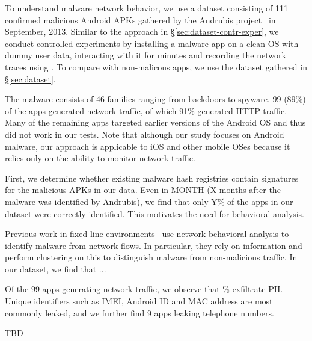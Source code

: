  To understand malware network behavior, we use a 
dataset consisting of 111 confirmed malicious Android APKs gathered by the Andrubis project~\cite{andrubis} in September, 2013.  
Similar to the approach in \S\ref{sec:dataset-contr-exper}, we conduct controlled experiments by installing 
a malware app on a clean OS with dummy user data, interacting with it for  minutes and recording the 
network traces using \meddle. To compare with non-malicous apps, we use the dataset gathered in \S\ref{sec:dataset}.

The malware consists of 46 families ranging from backdoors to spyware.  99 (89\%) of the apps generated network 
traffic, of which 91\% generated HTTP traffic. Many of the remaining apps targeted earlier versions of the Android 
OS and thus did not work in our tests. Note that although our study focuses on Android malware, our approach 
is applicable to iOS and other mobile OSes because it relies only on the ability to monitor network traffic.

 First, we determine whether existing malware hash registries 
contain signatures for the malicious APKs in our data. Even in MONTH (X months after the malware was identified 
by Andrubis), we find that only Y\% of the apps in our dataset were correctly identified. This motivates the need 
for behavioral analysis.

Previous work in fixed-line environments~\cite{perdisci:malwaresig} use network behavioral analysis to identify malware 
from network flows. In particular, they rely on \useragent information and perform clustering on this to distinguish 
malware from non-malicious traffic. In our dataset, we find that ...

Of the 99 apps generating network traffic, we observe that \tbd{}\% 
exfiltrate PII. Unique identifiers such as IMEI, Android ID and MAC address are most commonly leaked, and 
we further find 9 apps leaking telephone numbers. 

TBD 

%
